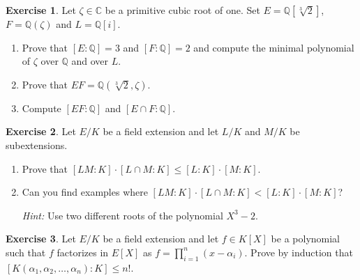\documentclass[a4paper,10pt,reqno]{amsart}
\newcommand{\Q}{\mathbb{Q}}
\newcommand{\C}{\mathbb{C}}
\theoremstyle{definition} %
\newtheorem{ex}{Exercise}[section]
\begin{document}
\begin{ex}
Let $\zeta\in\C$ be a primitive cubic root of one.
Set $E=\Q[\sqrt[3]{2}]$, $F=\Q(\zeta)$ and $L=\Q[i]$.
\begin{enumerate}[label=(\roman*)]
    \item Prove that $[E:\Q]=3$ and $[F:\Q]=2$ and compute the minimal polynomial of $\zeta$ over $\Q$ and over $L$.
    \item Prove that $EF=\Q(\sqrt[3]{2},\zeta)$.
    \item Compute $[EF:\Q]$ and $[E\cap F:\Q]$.
\end{enumerate}  
\end{ex}

\begin{ex}
    Let $E/K$ be a field extension and let $L/K$ and $M/K$ be subextensions.
    \begin{enumerate}[label=(\roman*)]
    \item Prove that $[LM : K ] \cdot [L \cap M : K] \leq [L:K] \cdot [M:K]$.
    \item Can you find examples where $[LM : K ] \cdot [L \cap M : K] < [L:K] \cdot [M:K]$?
    
    \noindent \textit{Hint:} Use two different roots of the polynomial $X^3 -2$.
    \end{enumerate}  
\end{ex}

\begin{ex}
    Let $E/K$ be a field extension and let $f \in K[X]$ be a polynomial such that $f$ factorizes in $E[X]$ as $f = \prod_{i=1}^n(x - \alpha_i)$. Prove by induction that $[K(\alpha_1,\alpha_2, \ldots, \alpha_n):K] \leq n!$.
\end{ex}
\end{document}
